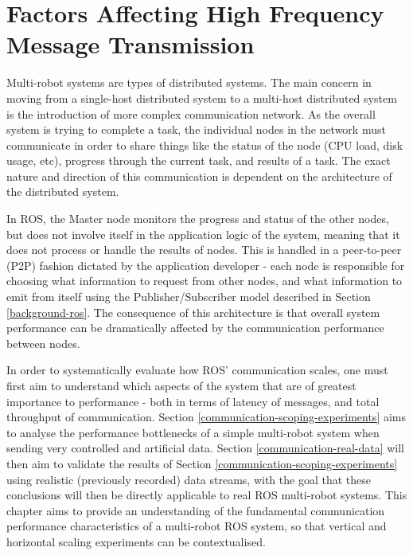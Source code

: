 \documentclass{l4proj}
\begin{document}


\chapter{Factors Affecting High Frequency Message Transmission}
\label{communication-chapter}

Multi-robot systems are types of distributed systems. The main concern in moving from a single-host distributed system to a multi-host distributed system is the introduction of more complex communication network. As the overall system is trying to complete a task, the individual nodes in the network must communicate in order to share things like the status of the node (CPU load, disk usage, etc), progress through the current task, and results of a task. The exact nature and direction of this communication is dependent on the architecture of the distributed system.

In ROS, the Master node monitors the progress and status of the other nodes, but does not involve itself in the application logic of the system, meaning that it does not process or handle the results of nodes. This is handled in a peer-to-peer (P2P) fashion dictated by the application developer - each node is responsible for choosing what information to request from other nodes, and what information to emit from itself using the Publisher/Subscriber model described in Section \ref{background-ros}. The consequence of this architecture is that overall system performance can be dramatically affected by the communication performance between nodes.

In order to systematically evaluate how ROS' communication scales, one must first aim to understand which aspects of the system that are of greatest importance to performance - both in terms of latency of messages, and total throughput of communication. Section \ref{communication-scoping-experiments} aims to analyse the performance bottlenecks of a simple multi-robot system when sending very controlled and artificial data. Section \ref{communication-real-data} will then aim to validate the results of Section \ref{communication-scoping-experiments} using realistic (previously recorded) data streams, with the goal that these conclusions will then be directly applicable to real ROS multi-robot systems. This chapter aims to provide an understanding of the fundamental communication performance characteristics of a multi-robot ROS system, so that vertical and horizontal scaling experiments can be contextualised.
\end{document}
